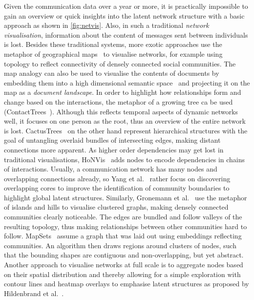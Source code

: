 Given the communication data over a year or more, it is practically impossible to gain an overview or quick insights into the latent network structure with a basic approach as shown in \ref{fig:netvis}.
Also, in such a traditional \textit{network visualisation}, information about the content of messages sent between individuals is lost.
Besides these traditional systems, more exotic approaches use the metaphor of geographical maps~\cite{pang2017creating} to visualise networks, for example using topology to reflect connectivity of densely connected social communities.
The map analogy can also be used to visualise the contents of documents by embedding them into a high dimensional semantic space~\cite{le2014distributed} and projecting it on the map as a \textit{document landscape}.
In order to highlight how relationships form and change based on the interactions, the metaphor of a growing tree ca be used (ContactTrees~\cite{sallaberry2016contact}).
Although this reflects temporal aspects of dynamic networks well, it focuses on one person as the root, thus an overview of the entire network is lost.
CactusTrees~\cite{dang2017cactustree} on the other hand represent hierarchical structures with the goal of untangling overlaid bundles of intersecting edges, making distant connections more apparent.
As higher order dependencies may get lost in traditional visualisations, HoNVis~\cite{tao2017honvis} adds nodes to encode dependencies in chains of interactions.
Usually, a communication network has many nodes and overlapping connections already, so Yang et al.~\cite{yang2014overlapping} rather focus on discovering overlapping cores to improve the identification of community boundaries to highlight global latent structures.
Similarly, Gronemann et al.~\cite{gronemann2012drawing} use the metaphor of islands and hills to visualise clustered graphs, making densely connected communities clearly noticeable.
The edges are bundled and follow valleys of the resulting topology, thus making relationships between other communities hard to follow.
MapSets~\cite{efrat2015mapsets} assume a graph that was laid out using embeddings reflecting communities.
An algorithm then draws regions around clusters of nodes, such that the bounding shapes are contiguous and non-overlapping, but yet abstract.
Another approach to visualise networks at full scale is to aggregate nodes based on their spatial distribution and thereby allowing for a simple exploration with contour lines and heatmap overlays to emphasise latent structures as proposed by Hildenbrand et al.~\cite{hildenbrand2016flexible}.

